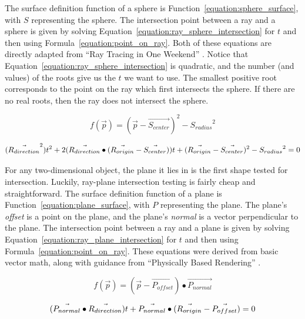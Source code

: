 
The surface definition function of a sphere is Function~\ref{equation:sphere_surface}, with $S$ representing the sphere.
The intersection point between a ray and a sphere is given by solving Equation~\ref{equation:ray_sphere_intersection} for $t$ and then using Formula~\ref{equation:point_on_ray}.
Both of these equations are directly adapted from ``Ray Tracing in One Weekend'' \cite{shirley2016ray}.
Notice that Equation~\ref{equation:ray_sphere_intersection} is quadratic, and the number (and values) of the roots give us the $t$ we want to use.
The smallest positive root corresponds to the point on the ray which first intersects the sphere.
If there are no real roots, then the ray does not intersect the sphere.

\begin{equation}
  \label{equation:sphere_surface}
  f(\vec{p}) = (\vec{p} - \vec{S_{center}})^2 - {S_{radius}}^2
\end{equation}

\begin{equation}
  \label{equation:ray_sphere_intersection}
  (\vec{R_{direction}}^2)t^2 + 2(\vec{R_{direction}} \bullet (\vec{R_{origin}} - \vec{S_{center}}))t + (\vec{R_{origin}} - \vec{S_{center}})^2 - {S_{radius}}^2 = 0
\end{equation}


For any two-dimensional object, the plane it lies in is the first shape tested for intersection.
Luckily, ray-plane intersection testing is fairly cheap and straightforward.
The surface definition function of a plane is Function~\ref{equation:plane_surface}, with $P$ representing the plane.
The plane's {\it offset} is a point on the plane, and the plane's {\it normal} is a vector perpendicular to the plane.
The intersection point between a ray and a plane is given by solving Equation~\ref{equation:ray_plane_intersection} for $t$ and then using Formula~\ref{equation:point_on_ray}.
These equations were derived from basic vector math, along with guidance from ``Physically Based Rendering'' \cite{pharr2016physically}.

\begin{equation}
  \label{equation:plane_surface}
  f(\vec{p}) = (\vec{p} - \vec{P_{offset}}) \bullet \vec{P_{normal}}
\end{equation}

\begin{equation}
  \label{equation:ray_plane_intersection}
  (\vec{P_{normal}} \bullet \vec{R_{direction}})t + \vec{P_{normal}} \bullet (\vec{R_{origin}} - \vec{P_{offset}}) = 0
\end{equation}

